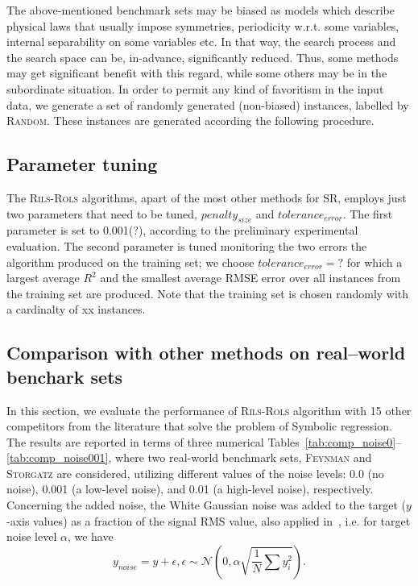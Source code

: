 \documentclass[a4paper,12pt]{elsarticle}
\begin{document}
The above-mentioned benchmark sets may be biased as models which describe physical laws that usually impose   symmetries, periodicity w.r.t. some variables, internal separability on some variables etc. In that way, the search process and the search space can be, in-advance, significantly reduced. Thus, some methods may get significant benefit with this regard, while some others may be in the subordinate situation. 
  In order to permit any kind of favoritism in the input data, we generate a set of randomly generated (non-biased) instances, labelled by \textsc{Random}. These instances are generated according the following procedure. 


\subsection{Parameter tuning}
The \textsc{Rils}-\textsc{Rols} algorithms, apart of the most other methods for SR, employs just two parameters that need to be tuned, $penalty_{size}$ and $tolerance_{error}$. The first parameter is set to 0.001(?), according to the preliminary experimental evaluation. The second parameter is tuned monitoring the two errors the algorithm produced on the training set; we choose $tolerance_{error}=?$ for which a largest average $R^2$ and the smallest average RMSE error over all instances from the training set are produced. Note that the training set is chosen randomly with a cardinalty of xx instances. 


\subsection{Comparison with other methods on real--world benchark sets}
In this section, we evaluate the performance of \textsc{Rils-Rols} algorithm with 15 other competitors from the literature that solve the problem of Symbolic regression. The results are reported in terms of three numerical Tables~\ref{tab:comp_noise0}--\ref{tab:comp_noise001}, where two real-world benchmark sets, \textsc{Feynman} and \textsc{Storgatz} are considered, utilizing  different values of the noise levels: 0.0 (no noise), 0.001 (a low-level noise), and 0.01 (a high-level noise), respectively. Concerning the added noise, the White Gaussian noise was added to the target ($y$-axis values) as a fraction of the signal RMS value, also applied in~\cite{la2021contemporary}, i.e. for target noise level $\alpha$, we have
$$ y_{noise} = y + \epsilon, \epsilon \sim \mathcal{N}\left(0, \alpha \sqrt{\frac{1}{N} \sum {y_i^2}}\right). $$
\end{document}
